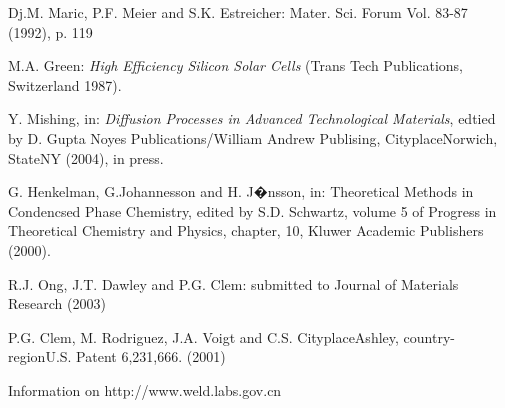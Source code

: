 \documentclass{TTP_DSL2006}
\begin{document}
\begin{thebibliography}{99}

 Dj.M. Maric, P.F. Meier and S.K. Estreicher: Mater. Sci. Forum Vol. 83-87 (1992), p. 119

 M.A. Green: \textit{High Efficiency Silicon Solar Cells }(Trans Tech Publications, Switzerland 1987).

 Y. Mishing, in: \textit{Diffusion Processes in Advanced Technological Materials}, 
edtied by D. Gupta Noyes Publications/William Andrew Publising, CityplaceNorwich, StateNY (2004), in press.

 G. Henkelman, G.Johannesson and H. J�nsson, in: Theoretical Methods in Condencsed 
Phase Chemistry, edited by S.D. Schwartz, volume 5 of Progress in Theoretical Chemistry and Physics, chapter, 
10, Kluwer Academic Publishers (2000).

 R.J. Ong, J.T. Dawley and P.G. Clem: submitted to Journal of Materials Research (2003) 

 P.G. Clem, M. Rodriguez, J.A. Voigt and C.S. CityplaceAshley, country-regionU.S. Patent 6,231,666. (2001) 

  Information on http://www.weld.labs.gov.cn

\end{thebibliography}
\end{document}
